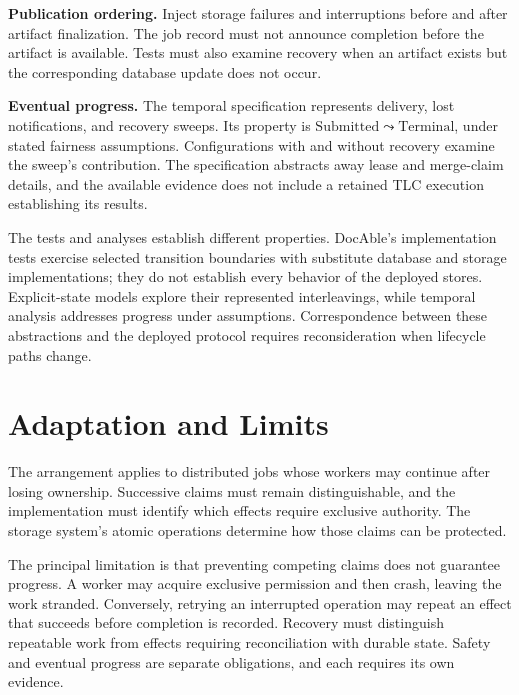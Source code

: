 
\textbf{Publication ordering.} Inject storage failures and interruptions before and after artifact finalization. The job record must not announce completion before the artifact is available. Tests must also examine recovery when an artifact exists but the corresponding database update does not occur.


\textbf{Eventual progress.} The temporal specification represents delivery, lost notifications, and recovery sweeps. Its property is \(\mathrm{Submitted} \leadsto \mathrm{Terminal}\), under stated fairness assumptions. Configurations with and without recovery examine the sweep's contribution. The specification abstracts away lease and merge-claim details, and the available evidence does not include a retained TLC execution establishing its results.



The tests and analyses establish different properties. DocAble's implementation tests exercise selected transition boundaries with substitute database and storage implementations; they do not establish every behavior of the deployed stores. Explicit-state models explore their represented interleavings, while temporal analysis addresses progress under assumptions. Correspondence between these abstractions and the deployed protocol requires reconsideration when lifecycle paths change.

\section{Adaptation and Limits}

The arrangement applies to distributed jobs whose workers may continue after losing ownership. Successive claims must remain distinguishable, and the implementation must identify which effects require exclusive authority. The storage system's atomic operations determine how those claims can be protected.

The principal limitation is that preventing competing claims does not guarantee progress. A worker may acquire exclusive permission and then crash, leaving the work stranded. Conversely, retrying an interrupted operation may repeat an effect that succeeds before completion is recorded. Recovery must distinguish repeatable work from effects requiring reconciliation with durable state. Safety and eventual progress are separate obligations, and each requires its own evidence.

